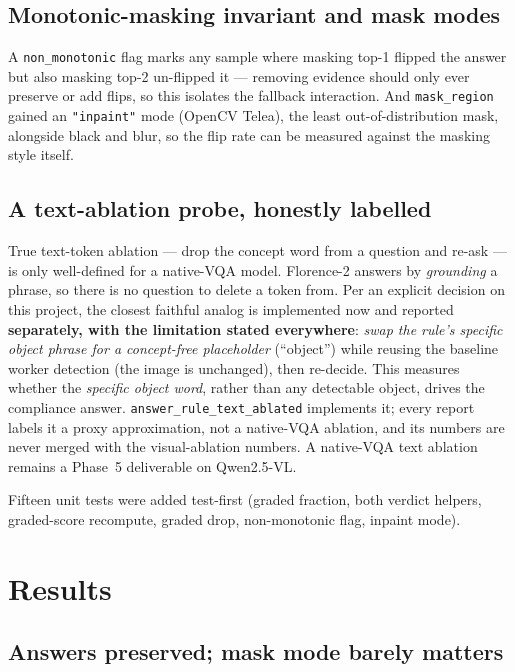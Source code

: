 \subsection{Monotonic-masking invariant and mask modes}

A \texttt{non\_monotonic} flag marks any sample where masking top-1 flipped the answer but also masking
top-2 un-flipped it --- removing evidence should only ever preserve or add flips, so this isolates the
fallback interaction. And \texttt{mask\_region} gained an \texttt{"inpaint"} mode (OpenCV Telea), the
least out-of-distribution mask, alongside black and blur, so the flip rate can be measured against the
masking style itself.

\subsection{A text-ablation probe, honestly labelled}

True text-token ablation --- drop the concept word from a question and re-ask --- is only well-defined
for a native-VQA model. Florence-2 answers by \emph{grounding} a phrase, so there is no question to
delete a token from. Per an explicit decision on this project, the closest faithful analog is
implemented now and reported \textbf{separately, with the limitation stated everywhere}: \emph{swap the
rule's specific object phrase for a concept-free placeholder} (``object'') while reusing the baseline
worker detection (the image is unchanged), then re-decide. This measures whether the \emph{specific
object word}, rather than any detectable object, drives the compliance answer.
\texttt{answer\_rule\_text\_ablated} implements it; every report labels it a proxy approximation, not a
native-VQA ablation, and its numbers are never merged with the visual-ablation numbers. A native-VQA
text ablation remains a Phase~5 deliverable on Qwen2.5-VL.

Fifteen unit tests were added test-first (graded fraction, both verdict helpers, graded-score
recompute, graded drop, non-monotonic flag, inpaint mode).

\section{Results}

\subsection{Answers preserved; mask mode barely matters}

